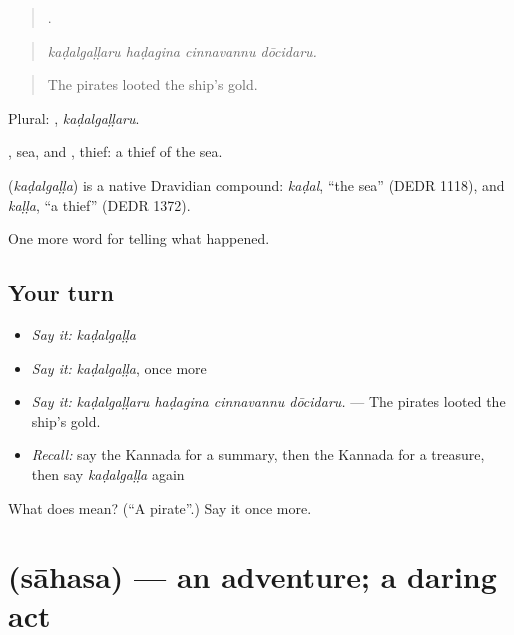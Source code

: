 \begin{quote}
   .
\end{quote}

\begin{quote}
\emph{kaḍalgaḷḷaru haḍagina cinnavannu dōcidaru.}
\end{quote}

\begin{quote}
The pirates looted the ship's gold.
\end{quote}

Plural: , \emph{kaḍalgaḷḷaru}.

, sea, and , thief: a thief of the sea.

\begin{cousinweb}
\textbf{} (\emph{kaḍalgaḷḷa}) is a native Dravidian compound: \emph{kaḍal}, \textquotedblleft{}the sea\textquotedblright{} (DEDR 1118), and \emph{kaḷḷa}, \textquotedblleft{}a thief\textquotedblright{} (DEDR 1372).
\end{cousinweb}

\begin{grammarlens}[title={What you've built}]
One more word for telling what happened.
\end{grammarlens}

\subsection*{Your turn}
\begin{itemize}
\raggedright
  \item \emph{Say it:} \emph{kaḍalgaḷḷa}
  \item \emph{Say it:} \emph{kaḍalgaḷḷa}, once more
  \item \emph{Say it:} \emph{kaḍalgaḷḷaru haḍagina cinnavannu dōcidaru.} — The pirates looted the ship's gold.
  \item \emph{Recall:} say the Kannada for a summary, then the Kannada for a treasure, then say \emph{kaḍalgaḷḷa} again
\end{itemize}

\begin{tcolorbox}[breakable,colback=teal!4,colframe=teal!35!black,title={Before you move on}]
What does  mean? (\textquotedblleft{}A pirate\textquotedblright{}.) Say it once more.
\end{tcolorbox}
\section[\texorpdfstring{\kn{ಸಾಹಸ} (sāhasa)}{ಸಾಹಸ (sāhasa)}]{ (sāhasa) — an adventure; a daring act}

